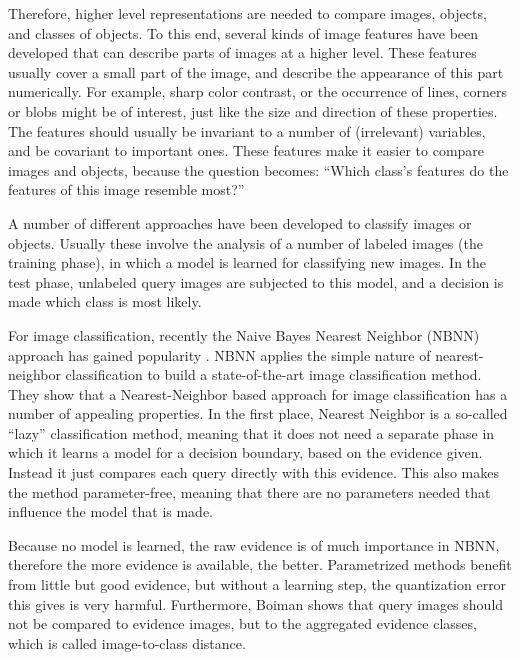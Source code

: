 Therefore, higher level representations are needed to compare images, objects, and classes of objects. To this end, several kinds of image features have been developed that can describe parts of images at a higher level. These features usually cover a small part of the image, and describe the appearance of this part numerically. For example, sharp color contrast, or the occurrence of lines, corners or blobs might be of interest, just like the size and direction of these properties. The features should usually be invariant to a number of (irrelevant) variables, and be covariant to important ones. These features make it easier to compare images and objects, because the question becomes: ``Which class's features do the features of this image resemble most?''

A number of different approaches have been developed to classify images or objects. Usually these involve the analysis of a number of labeled images (the training phase), in which a model is learned for classifying new images. In the test phase, unlabeled query images are subjected to this model, and a decision is made which class is most likely.

For image classification, recently the Naive Bayes Nearest Neighbor (NBNN) \cite{boiman2008defense} approach has gained popularity \cite{becker2012codebook, behmo2010towards, mccann2012local, timofte2012iterative, tuytelaars2011nbnn, wang2011improved, zhang2010random}. NBNN applies the simple nature of nearest-neighbor classification to build a state-of-the-art image classification method. They show that a Nearest-Neighbor based approach for image classification has a number of appealing properties. In the first place, Nearest Neighbor is a so-called ``lazy'' classification method, meaning that it does not need a separate phase in which it learns a model for a decision boundary, based on the evidence given. Instead it just compares each query directly with this evidence. This also makes the method parameter-free, meaning that there are no parameters needed that influence the model that is made.

Because no model is learned, the raw evidence is of much importance in NBNN, therefore the more evidence is available, the better. Parametrized methods benefit from little but good evidence, but without a learning step, the quantization error this gives is very harmful. Furthermore, Boiman shows that query images should not be compared to evidence images, but to the aggregated evidence classes, which is called image-to-class distance.

